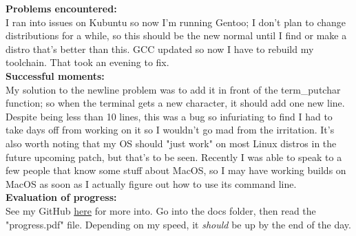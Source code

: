 \documentclass[11pt]{article}
\begin{document}
\textbf{Problems encountered:}\\
I ran into issues on Kubuntu so now I'm running Gentoo; I don't plan to change distributions for a while, so this should be the new normal until I find or make a distro that's better than this. GCC updated so now I have to rebuild my toolchain. That took an evening to fix.\\
\textbf{Successful moments:}\\
My solution to the newline problem was to add it in front of the term\_putchar function; so when the terminal gets a new character, it should add one new line. Despite being less than 10 lines, this was a bug so infuriating to find I had to take days off from working on it so I wouldn't go mad from the irritation. It's also worth noting that my OS should "just work" on most Linux distros in the future upcoming patch, but that's to be seen. Recently I was able to speak to a few people that know some stuff about MacOS, so I may have working builds on MacOS as soon as I actually figure out how to use its command line.\\
\textbf{Evaluation of progress:}\\
See my GitHub \href{https://github.com/cats64/ibpersonalproject}{here} for more into. Go into the docs folder, then read the "progress.pdf" file. Depending on my speed, it \textit{should} be up by the end of the day.\\
\end{document}
